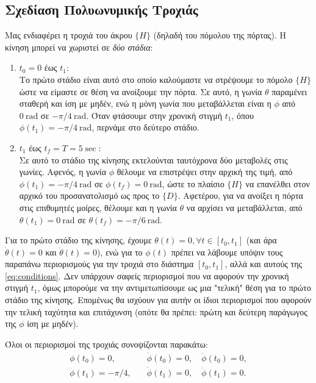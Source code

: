\documentclass[12pt]{article} %
\numberwithin{equation}{section}  %
\begin{document}
\subsection{Σχεδίαση Πολυωνυμικής Τροχιάς}
Μας ενδιαφέρει η τροχιά του άκρου $\{H\}$ (δηλαδή του πόμολου της πόρτας).
Η κίνηση μπορεί να χωριστεί σε \textit{δύο στάδια}:
\begin{enumerate}
    \item $t_0 = 0 $ έως $ t_1$: \\
    Το πρώτο στάδιο είναι αυτό στο οποίο καλούμαστε να στρέψουμε το πόμολο $\{H\}$ ώστε να είμαστε σε θέση να ανοίξουμε την πόρτα. 
    Σε αυτό, η γωνία $\theta$ παραμένει σταθερή και ίση με μηδέν, ενώ η μόνη γωνία που μεταβάλλεται είναι η $\phi$ από $0~\mathrm{rad}$ σε $-\pi /4~\mathrm{rad}$.
    Όταν φτάσουμε στην χρονική στιγμή $t_1$, όπου $\phi(t_1) = -\pi /4~\mathrm{rad}$, περνάμε στο δεύτερο στάδιο.
    \item $t_1 $ έως $ t_f = T = 5 \sec$: \\
    Σε αυτό το στάδιο της κίνησης εκτελούνται ταυτόχρονα δύο μεταβολές στις γωνίες. 
    Αφενός, η γωνία $\phi$ θέλουμε να επιστρέψει στην αρχική της τιμή, από $\phi(t_1) = -\pi /4~\mathrm{rad}$ σε $\phi(t_f) = 0~\mathrm{rad}$, ώστε το πλαίσιο $\{H\}$ να επανέλθει στον αρχικό του προσανατολισμό ως προς το $\{D\}$.
    Αφετέρου, για να ανοίξει η πόρτα στις επιθυμητές μοίρες, θέλουμε και η γωνία $\theta$ να αρχίσει να μεταβάλλεται, από $\theta(t_1) = 0~\mathrm{rad}$ σε $\theta(t_f) = -\pi/6~\mathrm{rad}$.
\end{enumerate}

Για το πρώτο στάδιο της κίνησης, έχουμε $\theta(t) = 0, \forall t\in [t_0, t_1]$ (και άρα $\dot\theta(t) = 0$ και $\ddot\theta(t) = 0$), 
ενώ για το $\phi(t)$ πρέπει να λάβουμε υπόψιν τους παραπάνω περιορισμούς για την τροχιά στο διάστημα $[t_0, t_1]$, αλλά και αυτούς της \eqref{eq:conditions}. 
Δεν υπάρχουν σαφείς περιορισμοί που να αφορούν την χρονική στιγμή $t_1$, όμως μπορούμε να την αντιμετωπίσουμε ως μια "τελική" θέση για το πρώτο στάδιο της κίνησης. 
Επομένως θα ισχύουν για αυτήν οι ίδιοι περιορισμοί που αφορούν την τελική ταχύτητα και επιτάχυνση (οπότε θα πρέπει: πρώτη και δεύτερη παράγωγος της $\phi$ ίση με μηδέν). 

Όλοι οι περιορισμοί της τροχιάς συνοψίζονται παρακάτω:
\begin{align}
    \phi(t_0) = 0,   \quad &\dot\phi(t_0) = 0, \quad \ddot\phi(t_0) = 0, \nonumber \\
    \phi(t_1) = -\pi/4, \quad &\dot\phi(t_1) = 0, \quad \ddot\phi(t_1) = 0. \label{eq:conditions_part1}
\end{align}
\end{document}
